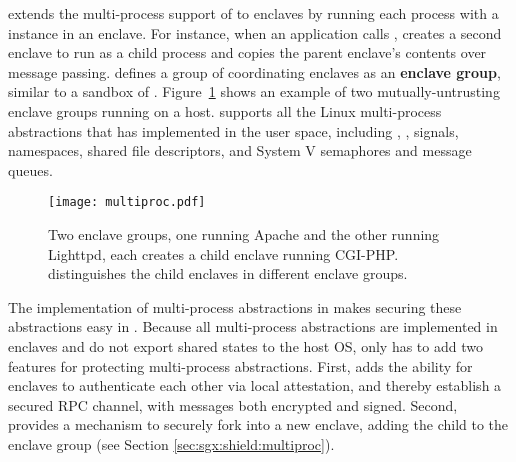 
\graphenesgx{} extends the multi-process support of \graphene{} to enclaves by running each
process with a \libos{} instance in an enclave.
For instance, when an application calls , \graphenesgx{} creates a second enclave to run as a child process
and copies the parent enclave's contents over message passing.
\graphenesgx{} defines
a group of coordinating enclaves as an {\bf enclave group},
similar to a sandbox of \graphene{}.
Figure~\ref{fig:sgx:enclave-groups} shows an example of two mutually-untrusting enclave groups running on a host.
\graphenesgx{} supports all the Linux multi-process abstractions that \graphene{} has implemented in the user space,
including , , signals, namespaces, shared file descriptors, and System V semaphores and message queues.


\begin{figure}[t!]
\centering
\texttt{[image: multiproc.pdf]}
\caption{Two enclave groups, one running Apache and the other running Lighttpd, each creates a child enclave running CGI-PHP.
\graphenesgx{} distinguishes the child enclaves in different enclave groups.}
\label{fig:sgx:enclave-groups}
\end{figure}



The implementation of multi-process abstractions in \graphene{}
makes securing these abstractions easy in \graphenesgx{}.
Because all multi-process abstractions are implemented in enclaves and
do not export shared states to the host OS,
\graphenesgx{} only has to add two features for protecting multi-process abstractions.
First, \graphenesgx{} adds
the ability for enclaves to authenticate each other via local attestation,
and thereby establish a secured RPC channel,
with messages both encrypted and signed.
Second, \graphenesgx{} provides
a mechanism to securely fork into a new enclave, adding the child to the enclave group (see Section \ref{sec:sgx:shield:multiproc}).





